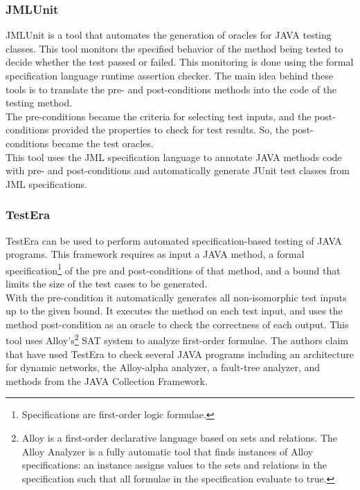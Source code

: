 \subsubsection{JMLUnit}
JMLUnit\cite{Cheon04thejml} is a tool that automates the generation of oracles for JAVA testing classes. This tool
monitors the specified behavior of the method being tested to decide whether the test passed or failed.
This monitoring is done using the formal specification language runtime assertion checker.
The main idea behind these tools is to translate the pre- and post-conditions methods into the code of the testing method.\\
The pre-conditions became the criteria for selecting test inputs, and the post-conditions provided the properties to check for
test results. So, the post-conditions became the test oracles.\\
This tool uses the JML\cite{Burdy03anoverview} specification language to annotate JAVA methods code with pre- and post-conditions and
automatically generate JUnit test classes from JML specifications.

\subsubsection{TestEra}
TestEra\cite{testera} can be used to perform automated specification-based testing of
JAVA programs. This framework requires as input a JAVA method, a formal specification\footnote{Specifications are first-order logic formulae.}
of the pre and post-conditions of that method, and a bound that limits the size of the test cases to be generated.\\
With the pre-condition it automatically generates all non-isomorphic test inputs up to the given bound.
It executes the method on each test input, and uses the method post-condition as an oracle to check the correctness of each output. This tool
uses Alloy's\footnote{Alloy is a first-order declarative language based on sets and relations. The Alloy Analyzer is a fully
automatic tool that finds instances of Alloy specifications: an instance
assigns values to the sets and relations in the specification such that
all formulae in the specification evaluate to true.} SAT system to analyze first-order  formulae.
The authors claim that have used TestEra to check several JAVA programs including an architecture for
dynamic networks, the Alloy-alpha analyzer, a fault-tree analyzer, and methods from the JAVA Collection Framework.

